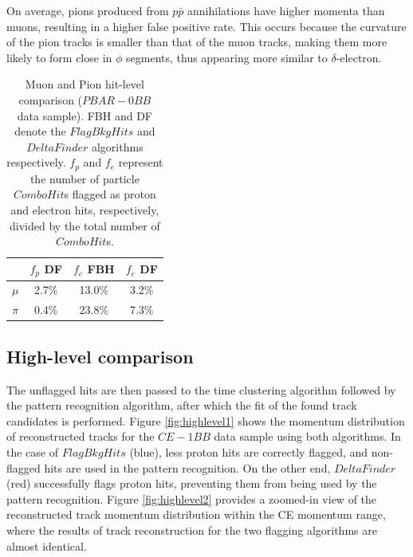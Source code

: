       On average, pions produced from $p\bar{p}$ annihilations 
      have higher momenta than muons, resulting in a higher false 
      positive rate. This occurs because the curvature of the pion tracks 
      is smaller than that of the muon tracks,
      making them more likely to form close in $\phi$ segments, thus appearing more similar to $\delta$-electron.


    \begin{center}
        \begin{table}[h!]
        \centering
        \renewcommand{\arraystretch}{1.}
        \begin{tabular}{| c | c | c | c|} 
        \hline
         &  $f_{p}$ DF &  $f_{e}$ FBH & $f_{e}$ DF\\
        \hline
        $\mu$  &  2.7\%  & 13.0\% & 3.2\%\\
        \hline
        $\pi$ & 0.4\% & 23.8\%& 7.3\%\\
        \hline
        \end{tabular}
        \caption{Muon and Pion 
        hit-level comparison ($PBAR-0BB$ data sample). FBH and DF denote 
        the $FlagBkgHits$ and $DeltaFinder$ algorithms respectively. $f_p$ and $f_e$ represent 
        the number of particle $ComboHit$s flagged as proton and electron hits, respectively, 
        divided by the total number of $ComboHit$s.}
        \label{tab:0bbpbar}
        \end{table}
        \end{center}

\subsection{High-level comparison}
The unflagged hits are then passed to the time clustering 
algorithm followed by the pattern recognition algorithm, 
after which the fit of the found track candidates 
is performed. 
Figure \ref{fig:highlevel1} shows the momentum 
distribution of reconstructed tracks for the $CE-1BB$ 
data sample using both algorithms. 
In the case of $FlagBkgHits$ (blue), less proton hits are  
correctly flagged, and non-flagged hits are
used in the pattern recognition. 
On the other end, $DeltaFinder$ (red) successfully flags 
proton hits, preventing them from 
being used by the pattern recognition. 
Figure \ref{fig:highlevel2} provides a zoomed-in view 
of the reconstructed track momentum distribution within 
the CE momentum range, where the results of track reconstruction 
for the two flagging algorithms are almost identical.

